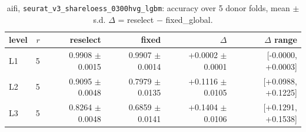 \begin{table}[t]
\centering
\small
\begin{tabular}{lrrrrr}
\toprule
level & $r$ & reselect & fixed & $\Delta$ & $\Delta$ range \\
\midrule
L1 & 5 & 0.9908 $\pm$ 0.0015 & 0.9907 $\pm$ 0.0014 & +0.0002 $\pm$ 0.0001 & [-0.0000, +0.0003] \\
L2 & 5 & 0.9095 $\pm$ 0.0048 & 0.7979 $\pm$ 0.0135 & +0.1116 $\pm$ 0.0105 & [+0.0988, +0.1225] \\
L3 & 5 & 0.8264 $\pm$ 0.0048 & 0.6859 $\pm$ 0.0141 & +0.1404 $\pm$ 0.0106 & [+0.1291, +0.1538] \\
\bottomrule
\end{tabular}
\caption{aifi, \texttt{seurat\_v3\_shareloess\_0300hvg\_lgbm}: accuracy over 5 donor folds, mean $\pm$ s.d. $\Delta$ = reselect $-$ fixed\_global.}
\label{tab:cv-aifi-seurat-v3-shareloess-0300hvg-lgbm-accuracy}
\end{table}